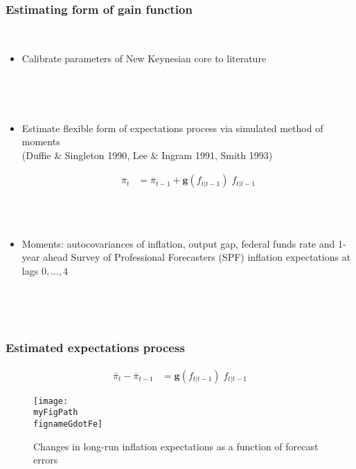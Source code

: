\documentclass[10pt]{beamer}
\def \myFigPath {../../../figures/}
\DeclareMathOperator{\E}{\mathbb{E}}
\def\fignameGdotFe{gdot_feN_100_nfe_5_gridspacing_manual_Wdiffs2_100000_Wmid_1000_Nsimulations_command_sigmas_13_Nov_2020_13_50_48}
\begin{document}
\begin{frame}[plain]  %
	\frametitle{Estimating form of gain function}\label{estimation_general}




\


\begin{itemize}
\item Calibrate parameters of New Keynesian core to literature 

\

\

\item Estimate flexible form of expectations process via simulated method of moments \\ (Duffie \& Singleton 1990, Lee \& Ingram 1991, Smith 1993)

\begin{align}
\bar{\pi}_{t}  &=\bar{\pi}_{t-1} +\mathbf{g}(f_{t|t-1}) \; f_{t|t-1} \tag{18}
\end{align}
\

\

\item Moments: autocovariances of inflation, output gap, federal funds rate and 1-year ahead Survey of Professional Forecasters (SPF) inflation expectations at lags $0, \dots, 4$
\end{itemize}

\

\

\vfill

 \hyperlink{calibration_lit}{}	 \hfill \hyperlink{estimation_details}{}




\end{frame}
\begin{frame}[plain]  %
	\frametitle{Estimated expectations process}

\begin{align}
\bar{\pi}_{t}  - \bar{\pi}_{t-1} &=\mathbf{g}(f_{t|t-1}) \; f_{t|t-1} \tag{18}
\end{align}


\begin{figure}[h!]
\texttt{[image: \\myFigPath \\fignameGdotFe]}
\caption{Changes in long-run inflation expectations as a function of forecast errors}
\label{epi}
\end{figure}

\vspace{-0.5cm}

 \hyperlink{calibration_lit}{}	
\end{frame}
\end{document}
